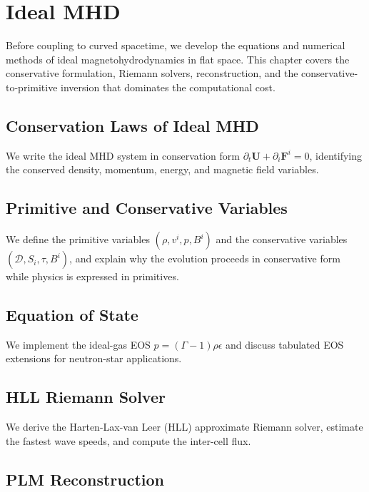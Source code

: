 \chapter{Ideal MHD}
\label{ch:ideal-mhd}

Before coupling to curved spacetime, we develop the equations and numerical
methods of ideal magnetohydrodynamics in flat space. This chapter covers the
conservative formulation, Riemann solvers, reconstruction, and the
conservative-to-primitive inversion that dominates the computational cost.

\section{Conservation Laws of Ideal MHD}
\label{sec:mhd-conservation}

We write the ideal MHD system in conservation form $\partial_t \mathbf{U} +
\partial_i \mathbf{F}^i = 0$, identifying the conserved density, momentum,
energy, and magnetic field variables.

\section{Primitive and Conservative Variables}
\label{sec:mhd-variables}

We define the primitive variables $(\rho, v^i, p, B^i)$ and the conservative
variables $(\mathcal{D}, S_i, \tau, B^i)$, and explain why the evolution
proceeds in conservative form while physics is expressed in primitives.

\section{Equation of State}
\label{sec:mhd-eos}

We implement the ideal-gas EOS $p = (\Gamma - 1)\rho\epsilon$ and discuss
tabulated EOS extensions for neutron-star applications.

\section{HLL Riemann Solver}
\label{sec:mhd-hll}

We derive the Harten-Lax-van Leer (HLL) approximate Riemann solver, estimate
the fastest wave speeds, and compute the inter-cell flux.

\section{PLM Reconstruction}
\label{sec:mhd-reconstruction}

